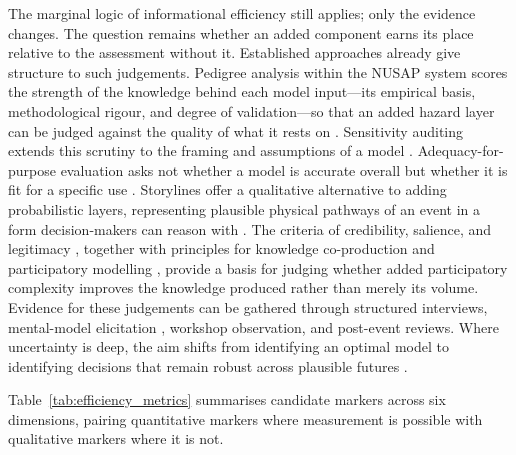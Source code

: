 \documentclass[12pt]{article}
\begin{document}
The marginal logic of informational efficiency still applies; only the evidence changes. The question remains whether an added component earns its place relative to the assessment without it. Established approaches already give structure to such judgements. Pedigree analysis within the NUSAP system scores the strength of the knowledge behind each model input---its empirical basis, methodological rigour, and degree of validation---so that an added hazard layer can be judged against the quality of what it rests on \citep{funtowicz1990uncertainty, vandersluijs2005combining}. Sensitivity auditing extends this scrutiny to the framing and assumptions of a model \citep{saltelli2013what}. Adequacy-for-purpose evaluation asks not whether a model is accurate overall but whether it is fit for a specific use \citep{parker2020model}. Storylines offer a qualitative alternative to adding probabilistic layers, representing plausible physical pathways of an event in a form decision-makers can reason with \citep{shepherd2018storylines, sillmann2021event}. The criteria of credibility, salience, and legitimacy \citep{cash2003knowledge}, together with principles for knowledge co-production and participatory modelling \citep{hegger2012conceptualising, voinov2016modelling, norstrom2020principles}, provide a basis for judging whether added participatory complexity improves the knowledge produced rather than merely its volume. Evidence for these judgements can be gathered through structured interviews, mental-model elicitation \citep{morgan2002risk}, workshop observation, and post-event reviews. Where uncertainty is deep, the aim shifts from identifying an optimal model to identifying decisions that remain robust across plausible futures \citep{stirling2010keep, marchau2019decision}.

Table~\ref{tab:efficiency_metrics} summarises candidate markers across six dimensions, pairing quantitative markers where measurement is possible with qualitative markers where it is not.
\end{document}
